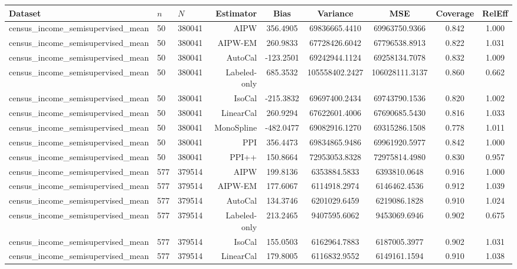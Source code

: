 \begin{tabular}{lllrccccc}
\toprule
Dataset & $n$ & $N$ & Estimator & Bias & Variance & MSE & Coverage & RelEff \\
\midrule
census\_income\_semisupervised\_mean & 50 & 380041 & AIPW & 356.4905 & 69836665.4410 & 69963750.9366 & 0.842 & 1.000 \\
census\_income\_semisupervised\_mean & 50 & 380041 & AIPW-EM & 260.9833 & 67728426.6042 & 67796538.8913 & 0.822 & 1.031 \\
census\_income\_semisupervised\_mean & 50 & 380041 & AutoCal & -123.2501 & 69242944.1124 & 69258134.7078 & 0.832 & 1.009 \\
census\_income\_semisupervised\_mean & 50 & 380041 & Labeled-only & 685.3532 & 105558402.2427 & 106028111.3137 & 0.860 & 0.662 \\
census\_income\_semisupervised\_mean & 50 & 380041 & IsoCal & -215.3832 & 69697400.2434 & 69743790.1536 & 0.820 & 1.002 \\
census\_income\_semisupervised\_mean & 50 & 380041 & LinearCal & 260.9294 & 67622601.4006 & 67690685.5430 & 0.816 & 1.033 \\
census\_income\_semisupervised\_mean & 50 & 380041 & MonoSpline & -482.0477 & 69082916.1270 & 69315286.1508 & 0.778 & 1.011 \\
census\_income\_semisupervised\_mean & 50 & 380041 & PPI & 356.4473 & 69834865.9486 & 69961920.5977 & 0.842 & 1.000 \\
census\_income\_semisupervised\_mean & 50 & 380041 & PPI++ & 150.8664 & 72953053.8328 & 72975814.4980 & 0.830 & 0.957 \\
census\_income\_semisupervised\_mean & 577 & 379514 & AIPW & 199.8136 & 6353884.5833 & 6393810.0648 & 0.916 & 1.000 \\
census\_income\_semisupervised\_mean & 577 & 379514 & AIPW-EM & 177.6067 & 6114918.2974 & 6146462.4536 & 0.912 & 1.039 \\
census\_income\_semisupervised\_mean & 577 & 379514 & AutoCal & 134.3746 & 6201029.6459 & 6219086.1828 & 0.910 & 1.024 \\
census\_income\_semisupervised\_mean & 577 & 379514 & Labeled-only & 213.2465 & 9407595.6062 & 9453069.6946 & 0.902 & 0.675 \\
census\_income\_semisupervised\_mean & 577 & 379514 & IsoCal & 155.0503 & 6162964.7883 & 6187005.3977 & 0.902 & 1.031 \\
census\_income\_semisupervised\_mean & 577 & 379514 & LinearCal & 179.8005 & 6116832.9552 & 6149161.1594 & 0.910 & 1.038 \\

\end{tabular}
